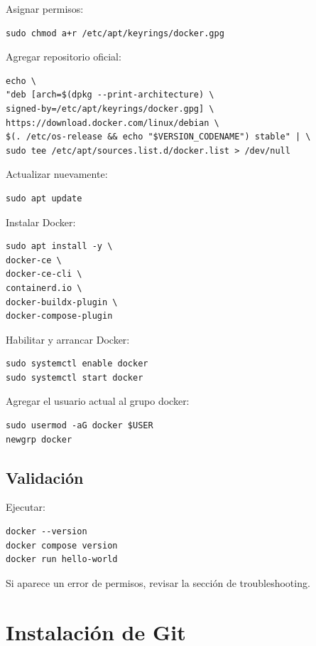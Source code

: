 \documentclass[
  coursetitle={Cómputo Nube y Tecnologías Emergentes},
  coursehours={96},
  coursedate={Verano 2026},
  doctype={Laboratorio},
  otherlangs={english,french},
  authorname={Lázaro},
  authorsurname={Bustio-Martínez},
  authortitle={PhD},
  role={Profesor Investigador},
  email={lbustio@inaoe.mx},
  phone={5559504000},
  ext={7459},
  institution={Instituto Nacional de Astrofísica, Óptica y Electrónica (INAOE)},
  department={Maestría en Ciencias en Tecnologías de Seguridad},
  address={Luis Enrique Erro 1, Sta. Ma. Tonantzintla, San Andrés Cholula, CP 72840, Puebla, México},
  margin={0.5in}
]{../../lbustio_lecture_notes}
\begin{document}
Asignar permisos:

\begin{lstlisting}
sudo chmod a+r /etc/apt/keyrings/docker.gpg
\end{lstlisting}

Agregar repositorio oficial:

\begin{lstlisting}
echo \
"deb [arch=$(dpkg --print-architecture) \
signed-by=/etc/apt/keyrings/docker.gpg] \
https://download.docker.com/linux/debian \
$(. /etc/os-release && echo "$VERSION_CODENAME") stable" | \
sudo tee /etc/apt/sources.list.d/docker.list > /dev/null
\end{lstlisting}

Actualizar nuevamente:

\begin{lstlisting}
sudo apt update
\end{lstlisting}

Instalar Docker:

\begin{lstlisting}
sudo apt install -y \
docker-ce \
docker-ce-cli \
containerd.io \
docker-buildx-plugin \
docker-compose-plugin
\end{lstlisting}

Habilitar y arrancar Docker:

\begin{lstlisting}
sudo systemctl enable docker
sudo systemctl start docker
\end{lstlisting}

Agregar el usuario actual al grupo docker:

\begin{lstlisting}
sudo usermod -aG docker $USER
newgrp docker
\end{lstlisting}

\subsection{Validación}

Ejecutar:

\begin{lstlisting}
docker --version
docker compose version
docker run hello-world
\end{lstlisting}

Si aparece un error de permisos, revisar la sección de troubleshooting.

\section{Instalación de Git}
\end{document}
